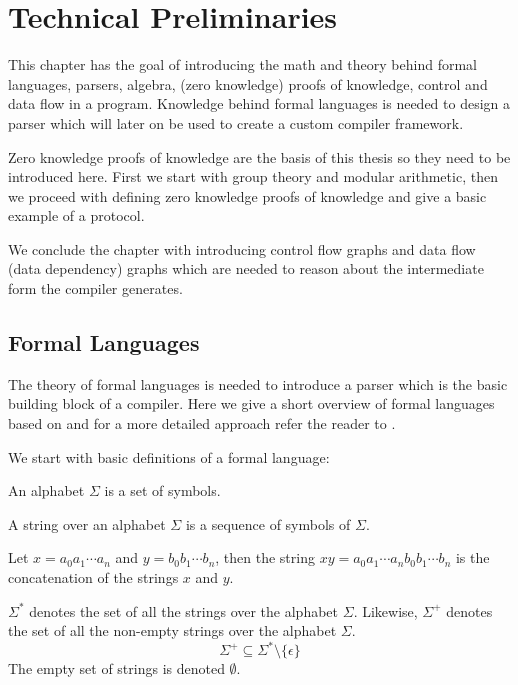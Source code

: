 \chapter{Technical Preliminaries}

This chapter has the goal of introducing the math and theory behind
formal languages, parsers, algebra, (zero knowledge) proofs of
knowledge, control and data flow in a program. Knowledge behind formal
languages is needed to design a parser which will later on be used to
create a custom compiler framework.

Zero knowledge proofs of knowledge are the basis of this thesis so
they need to be introduced here. First we start with group theory and
modular arithmetic, then we proceed with defining zero knowledge proofs
of knowledge and give a basic example of a protocol.

We conclude the chapter with introducing control flow graphs and data
flow (data dependency) graphs which are needed to reason about the
intermediate form the compiler generates.

\section{Formal Languages}

The theory of formal languages is needed to introduce a parser which
is the basic building block of a compiler. Here we give a short
overview of formal languages based on \cite{formal_languages} and for
a more detailed approach refer the reader to \cite{Hopcroft}.

We start with basic definitions of a formal language:

\begin{defn}[Alphabet]
  An alphabet $\Sigma$ is a set of symbols.
\end{defn}

\begin{defn}[String]
  A string over an alphabet $\Sigma$ is a sequence of symbols of $\Sigma$.
\end{defn}

\begin{defn}[Concatenation]
  Let $x = a_0 a_1 \dotsm a_n$ and $y = b_0 b_1 \dotsm b_n$, then the
  string $x y = a_0 a_1 \dotsm a_n b_0 b_1 \dotsm b_n$ is the
  concatenation of the strings $x$ and $y$.
\end{defn}

\begin{defn}[Sets]
  $\Sigma^*$ denotes the set of all the strings over the alphabet
  $\Sigma$. Likewise, $\Sigma^+$ denotes the set of all the non-empty
  strings over the alphabet $\Sigma$. $$\Sigma^+ \subseteq \Sigma^*
  \setminus \{ \epsilon \}$$ The empty set of strings is denoted
  $\emptyset$.
\end{defn}

